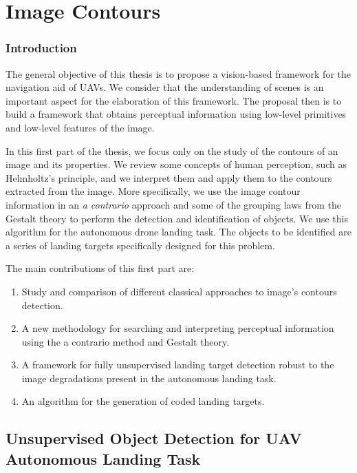 \part{Image Contours}\label{part:image_contours}

\section*{Introduction}
The general objective of this thesis is to propose a vision-based framework for the navigation aid of UAVs. We consider that the understanding of scenes is an important aspect for the elaboration of this framework. The proposal then is to build a framework that obtains perceptual information using low-level primitives and low-level features of the image. 

In this first part of the thesis, we focus only on the study of the contours of an image and its properties. We review some concepts of human perception, such as Helmholtz's principle, and we interpret them and apply them to the contours extracted from the image. More specifically, we use the image contour information in an \textit{a contrario} approach and some of the grouping laws from the Gestalt theory to perform the detection and identification of objects. We use this algorithm for the autonomous drone landing task. The objects to be identified are a series of landing targets specifically designed for this problem.

The main contributions of this first part are:

\begin{enumerate}
	\item Study and comparison of different classical approaches to image's contours detection.
	\item A new methodology for searching and interpreting perceptual information using the a contrario method and Gestalt theory.
	\item A framework for fully unsupervised landing target detection robust to the image degradations present in the autonomous landing task.
	\item An algorithm for the generation of coded landing targets.
\end{enumerate}


\chapter{Unsupervised Object Detection for UAV Autonomous Landing Task} \label{ch:landing_target_detection}

